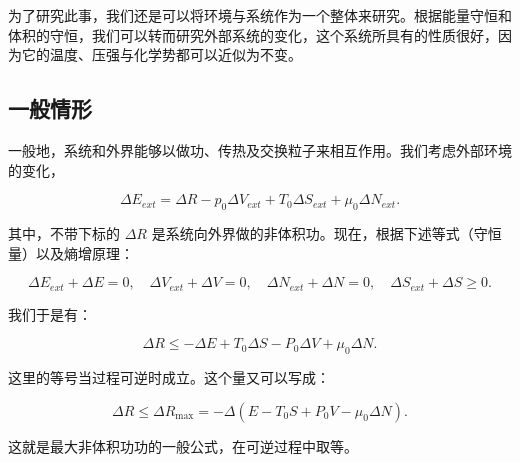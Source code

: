 为了研究此事，我们还是可以将环境与系统作为一个整体来研究。根据能量守恒和体积的守恒，我们可以转而研究外部系统的变化，这个系统所具有的性质很好，因为它的温度、压强与化学势都可以近似为不变。
\subsection{一般情形}
一般地，系统和外界能够以做功、传热及交换粒子来相互作用。我们考虑外部环境的变化，\begin{linenomath}\begin{equation}
\Delta E_{ext} = \Delta R - p_0\Delta V_{ext} + T_0\Delta S_{ext} + \mu_0\Delta N_{ext}. 
\end{equation}\end{linenomath}
其中，不带下标的 $\Delta R$ 是系统向外界做的非体积功。现在，根据下述等式（守恒量）以及熵增原理：
\begin{linenomath}\begin{equation}\Delta E_{ext} + \Delta E = 0, \quad \Delta V_{ext}+\Delta V = 0, \quad \Delta N_{ext} +\Delta N = 0, \quad \Delta S_{ext}+\Delta S \geq 0.\end{equation}\end{linenomath}
我们于是有：
\begin{linenomath}\begin{equation}
\Delta R \leq -\Delta E +T_0\Delta S-P_0\Delta V+\mu_0\Delta N.
\end{equation}\end{linenomath}
这里的等号当过程可逆时成立。这个量又可以写成：
\begin{linenomath}\begin{equation}
\Delta R \leq \Delta R_{\max} = -\Delta\left( E-T_0S + P_0V-\mu_0\Delta N \right).
\end{equation}\end{linenomath}
这就是最大非体积功功的一般公式，在可逆过程中取等。
